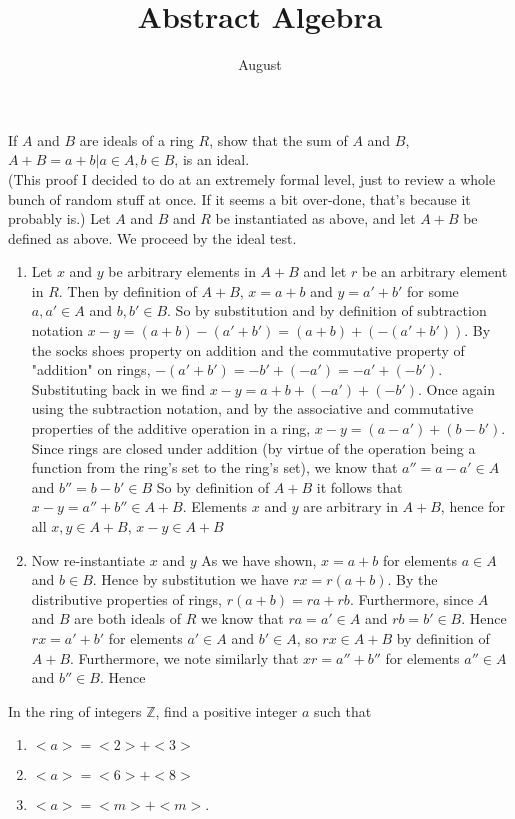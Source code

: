\documentclass{article}
\title{Abstract Algebra}
\author{August}
\newcommand{\Z}{\mathbb{Z}}
\begin{document}
\maketitle
{} If $A$ and $B$ are ideals of a ring $R$, show that the sum of $A$ and $B$,
$A + B = {a +b | a \in A, b \in B}$, is an ideal.\\

 (This proof I decided to do at an extremely formal level, just to review a whole bunch of random stuff at once. If it seems a bit over-done, that's because it probably is.) Let $A$ and $B$ and $R$ be instantiated as above, and let $A+B$ be defined as above. We proceed by the ideal test. 

\begin{enumerate}
    \item Let $x$ and $y$ be arbitrary elements in $A+B$ and let $r$ be an arbitrary element in $R$. Then by definition of $A+B$, $x = a + b$ and $y = a' + b'$ for some $a,a'\in A$ and $b,b'\in B$. So by substitution and by definition of subtraction notation $x - y = (a + b) - (a' + b') = (a + b) + (-(a'+ b')).$ By the socks shoes property on addition and the commutative property of "addition" on rings, $-(a' + b') = -b' + (-a') = -a' + (-b')$. Substituting back in we find $x - y = a + b + (-a') + (-b').$ Once again using the subtraction notation, and by the associative and commutative properties of the additive operation in a ring, $x-y = (a -a') + (b - b').$ Since rings are closed under addition (by virtue of the operation being a function from the ring's set to the ring's set), we know that $a'' = a-a'\in A$ and $b'' = b-b'\in B$ So by definition of $A+ B$ it follows that $x- y = a'' +b'' \in A + B$. Elements $x$ and $y$ are arbitrary in $A+B$, hence for all $x,y\in A+B$, $x-y\in A +B$ 
    \item Now re-instantiate $x$ and $y$ As we have shown, $x = a + b$ for elements $a\in A$ and $b\in B$. Hence by substitution we have $rx = r(a +b)$. By the distributive properties of rings, $r(a+ b) = ra + rb$. Furthermore, since $A$ and $B$ are both ideals of $R$ we know that $ra = a' \in A$ and $rb = b' \in B$. Hence $rx = a' + b'$ for elements $a'\in A$ and $b' \in A$, so $rx \in A+ B$ by definition of $A+ B$. Furthermore, we note similarly that $xr = a'' + b''$ for elements $a''\in A$ and $b'' \in B$. Hence 
\end{enumerate}


 In the ring of integers $\Z$, find a positive integer $a$ such that 
\begin{enumerate}
    \item $<a> = <2> + <3>$
    \item $<a> = <6> + <8>$
    \item $<a> = <m> + <m>$.
\end{enumerate}
\end{document}
